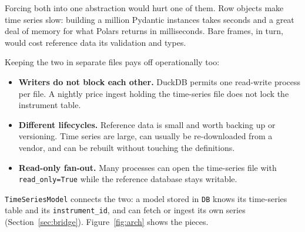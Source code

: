 \documentclass[11pt,a4paper]{article}
\newcommand{\code}[1]{\texttt{#1}}
\begin{document}
Forcing both into one abstraction would hurt one of them. Row objects make time series
slow: building a million Pydantic instances takes seconds and a great deal of memory for
what Polars returns in milliseconds. Bare frames, in turn, would cost reference data its
validation and types.

Keeping the two in separate files pays off operationally too:

\begin{itemize}
  \item \textbf{Writers do not block each other.} DuckDB permits one read-write process
    per file. A nightly price ingest holding the time-series file does not lock the
    instrument table.
  \item \textbf{Different lifecycles.} Reference data is small and worth backing up or
    versioning. Time series are large, can usually be re-downloaded from a vendor, and can
    be rebuilt without touching the definitions.
  \item \textbf{Read-only fan-out.} Many processes can open the time-series file with
    \code{read\_only=True} while the reference database stays writable.
\end{itemize}

\code{TimeSeriesModel} connects the two: a model stored in \code{DB} knows its
time-series table and its \code{instrument\_id}, and can fetch or ingest its own series
(Section~\ref{sec:bridge}). Figure~\ref{fig:arch} shows the pieces.
\end{document}
